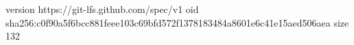 version https://git-lfs.github.com/spec/v1
oid sha256:c0f90a5f6bcc881feee103c69bfd572f1378183484a8601e6c41e15aed506aea
size 132
